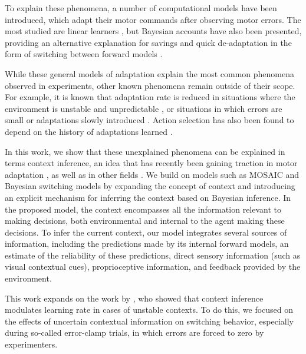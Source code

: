 \documentclass[a4paper,doc,floatsintext,natbib]{apa6}%
\begin{document}
To explain these phenomena, a number of computational models have been introduced, which adapt their motor commands after observing motor errors. The most studied are linear learners \citep{Smith_Interacting_2006,Forano_Timescales_2020,Scheidt_Learning_2001}, but Bayesian accounts have also been presented, providing an alternative explanation for savings and quick de-adaptation in the form of switching between forward models \citep{Kording_Bayesian_2004,Oh_Minimizing_2019}.

While these general models of adaptation explain the most common phenomena observed in experiments, other known phenomena remain outside of their scope. For example, it is known that adaptation rate is reduced in situations where the environment is unstable and unpredictable \citep{Herzfeld_memory_2014}, or situations in which errors are small \citep{Marko_Sensitivity_2012} or adaptations slowly introduced \citep{Huang_Persistence_2009}. Action selection has also been found to depend on the history of adaptations learned \citep{Vaswani_Decay_2013,Davidson_Scaling_2004}.

In this work, we show that these unexplained phenomena can be explained in terms context inference, an idea that has recently been gaining traction in motor adaptation \citep{Heald_Contextual_2021}, as well as in other fields \cite[e.g.][]{Sanders_Hippocampal_2020,Hunter_Contextsensitive_2021}. We build on models such as MOSAIC \citep{Wolpert_Multiple_1998} and Bayesian switching models \citep{Kording_Bayesian_2004,Oh_Minimizing_2019} by expanding the concept of context and introducing an explicit mechanism for inferring the context based on Bayesian inference. In the proposed model, the context encompasses all the information relevant to making decisions, both environmental and internal to the agent making these decisions. To infer the current context, our model integrates several sources of information, including the predictions made by its internal forward models, an estimate of the reliability of these predictions, direct sensory information (such as visual contextual cues), proprioceptive information, and feedback provided by the environment.

This work expands on the work by \cite{Heald_Contextual_2021}, who showed that context inference modulates learning rate in cases of unstable contexts. To do this, we focused on the effects of uncertain contextual information on switching behavior, especially during so-called error-clamp trials, in which errors are forced to zero by experimenters.
\end{document}

